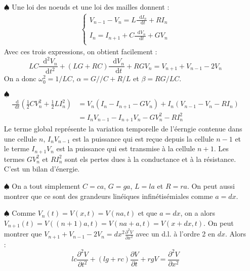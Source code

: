 \documentclass{report}
\newcommand*\dif{\mathop{}\!\mathrm{d}}
\begin{document}
\begin{itemize}

	\item[$\spadesuit$] 	
	Une loi des noeuds et une loi des mailles donnent : 
	\begin{align*}
	\left\lbrace
	\begin{array}{ccc}
	V_{n-1}-V_{n}=L\frac{\dif I_{n}}{\dif t} + RI_n\\
	\\
	I_{n}=I_{n+1}+C\frac{\dif V_{n}}{\dif t}+GV_n\\
	\end{array}\right.
	\end{align*}		
	Avec ces trois expressions, on obtient facilement :
	\begin{equation}
		LC\frac{\dif^2 V_n}{\dif t^2} + (LG+RC)\frac{\dif V_{n}}{\dif t}+RGV_n=V_{n+1}+V_{n-1}-2V_n
		\label{eq:prop}
	\end{equation}
	On a donc $\omega_0^2=1/LC$, $\alpha=G//C+R/L$ et $\beta=RG/LC$.
	
	 \item[$\spadesuit$] 
	 \begin{align*}
	 \frac{\dif}{\dif t}\left( \frac{1}{2}CV_n^2 +\frac{1}{2} LI_n^2 \right) &=V_n(I_{n}-I_{n+1}-GV_n)+ I_n(V_{n-1}-V_{n}-RI_n) \\
	 &=I_nV_{n-1}-I_{n+1}V_n-GV_n^2-RI_n^2
	 \end{align*}
	 Le terme global représente la variation temporelle de l'éerngie contenue dans une cellule $n$, $I_nV_{n-1}$ est la puissance qui est reçue depuis la cellule $n-1$ et le terme $I_{n+1}V_n$ est la puissance qui est transmise à la cellule $n+1$. Les termes $GV_n^2$ et $RI_n^2$ sont els pertes dues à la conductance et à la résistance. C'est un bilan d'énergie.

	\item[$\spadesuit$] On a tout simplement $C = ca$, $G=ga$, $L=la$ et $R=ra$. On peut aussi montrer que ce sont des grandeurs linéiques infinétisémiales comme $a=dx$.

	\item[$\spadesuit$] Comme $V_n(t)=V(x,t)=V(na,t)$ et que $a=dx$, on a alors $V_{n+1}(t)=V((n+1)a,t) = V(na+a,t)=V(x+dx,t)$.
	On peut montrer que $V_{n+1}+V_{n-1}-2V_n=dx^2\frac{\partial^2V}{\partial x^2}$ avec un d.l. à l'ordre 2 en $dx$. Alors :
	\begin{equation}
		lc\frac{\partial^2 V}{\partial t^2} + (lg+rc)\frac{\partial V}{\partial t}+rgV=\frac{\partial^2V}{\partial x^2}
		\label{eq:prop}
	\end{equation}


\end{itemize}
\end{document}
